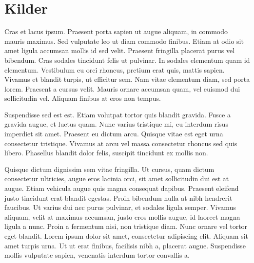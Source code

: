 \documentclass[../../main.tex]{subfiles}
\begin{document}
\chapter{Kilder}

Cras et lacus ipsum. Praesent porta sapien ut augue aliquam, in commodo mauris maximus. Sed vulputate leo ut diam commodo finibus. Etiam at odio sit amet ligula accumsan mollis id sed velit. Praesent fringilla placerat purus vel bibendum. Cras sodales tincidunt felis ut pulvinar. In sodales elementum quam id elementum. Vestibulum eu orci rhoncus, pretium erat quis, mattis sapien. Vivamus et blandit turpis, ut efficitur sem. Nam vitae elementum diam, sed porta lorem. Praesent a cursus velit. Mauris ornare accumsan quam, vel euismod dui sollicitudin vel. Aliquam finibus at eros non tempus.

Suspendisse sed est est. Etiam volutpat tortor quis blandit gravida. Fusce a gravida augue, et luctus quam. Nunc varius tristique mi, eu interdum risus imperdiet sit amet. Praesent eu dictum arcu. Quisque vitae est eget urna consectetur tristique. Vivamus at arcu vel massa consectetur rhoncus sed quis libero. Phasellus blandit dolor felis, suscipit tincidunt ex mollis non.

Quisque dictum dignissim sem vitae fringilla. Ut cursus, quam dictum consectetur ultricies, augue eros lacinia orci, sit amet sollicitudin dui est at augue. Etiam vehicula augue quis magna consequat dapibus. Praesent eleifend justo tincidunt erat blandit egestas. Proin bibendum nulla at nibh hendrerit faucibus. Ut varius dui nec purus pulvinar, et sodales ligula semper. Vivamus aliquam, velit at maximus accumsan, justo eros mollis augue, id laoreet magna ligula a nunc. Proin a fermentum nisi, non tristique diam. Nunc ornare vel tortor eget blandit. Lorem ipsum dolor sit amet, consectetur adipiscing elit. Aliquam sit amet turpis urna. Ut ut erat finibus, facilisis nibh a, placerat augue. Suspendisse mollis vulputate sapien, venenatis interdum tortor convallis a.
\end{document}
